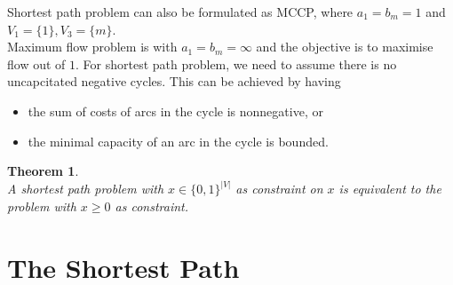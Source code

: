 \documentclass[12pt]{article}
\newtheorem{theorem}{Theorem}[section]
\theoremstyle{definition}
\begin{document}
Shortest path problem can also be formulated as MCCP, where $a_1=b_m=1$ and $V_1=\{1\}, V_3=\{m\}$.\\
Maximum flow problem is with $a_1=b_m=\infty$ and the objective is to maximise flow out of $1$.
For shortest path problem, we need to assume there is no uncapcitated negative cycles. This can be achieved by having
\begin{itemize}
  \item the sum of costs of arcs in the cycle is nonnegative, or
  \item the minimal capacity of an arc in the cycle is bounded.
\end{itemize}
\begin{theorem}\hfill\\\normalfont
A shortest path problem with $x\in\{0,1\}^{|V|}$ as constraint on $x$ is equivalent to the problem with $x\geq 0$ as constraint.
\end{theorem}
\clearpage
\section{The Shortest Path}
\end{document}
